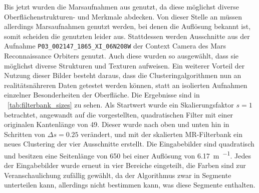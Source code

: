 Bis jetzt wurden die Marsaufnahmen aus \cite[Kap.~7]{greeley_13} genutzt, da diese möglichst diverse Oberflächenstrukturen- und Merkmale abdecken. Von dieser Stelle an müssen allerdings Marsaufnahmen genutzt werden, bei denen die Auflösung bekannt ist, somit scheiden die genutzten leider aus. Stattdessen werden Ausschnitte aus der Aufnahme \texttt{P03\_002147\_1865\_XI\_06N208W} der Context Camera des Mars Reconnaissance Orbiters genutzt. Auch diese wurden so ausgewählt, dass sie möglichst diverse Strukturen und Texturen aufweisen. Ein weiterer Vorteil der Nutzung dieser Bilder besteht daraus, dass die Clusteringalgorithmen nun an realitätsnähreren Daten getestet werden können, statt an isolierten Aufnahmen einzelner Besonderheiten der Oberfläche. Die Ergebnisse sind in \tablename~\ref{tab:filterbank_sizes} zu sehen. Als Startwert wurde ein Skalierungsfaktor $s=1$ betrachtet, angewandt auf die vorgestellten, quadratischen Filter mit einer originalen Kantenlänge von \SI{49}{\pixel}.  Dieser wurde nach oben und unten hin in Schritten von $\Delta s=0.25$ verändert, und mit der skalierten MR-Filterbank ein neues Clustering der vier Ausschnitte erstellt. Die Eingabebilder sind quadratisch und besitzen eine Seitenlänge von \SI{650}{\pixel} bei einer Auflösung von \SI{6,17}{\meter\per\pixel}. Jedes der Eingabebilder wurde erneut in vier Bereiche eingeteilt, die Farben sind zur Veranschaulichung zufällig gewählt, da der Algorithmus zwar in Segmente unterteilen kann, allerdings nicht bestimmen kann, was diese Segmente enthalten.

